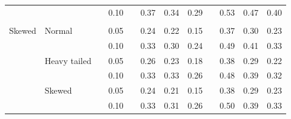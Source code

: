 \documentclass[12pt]{article} %
\begin{document}
\begin{table}[ht]
\begin{scriptsize}
\begin{center}
\begin{tabular}{ll p{.1cm} c p{.1cm} rrr p{.1cm} rrr}
             &              && 0.10 &&  0.37 & 0.34 & 0.29 && 0.53 & 0.47 & 0.40 \\ 
             &&&&&&&&&&&\\
Skewed       & Normal       && 0.05 &&  0.24 & 0.22 & 0.15 && 0.37 & 0.30 & 0.23 \\ 
             &              && 0.10 &&  0.33 & 0.30 & 0.24 && 0.49 & 0.41 & 0.33 \\ 
             & Heavy tailed && 0.05 &&  0.26 & 0.23 & 0.18 && 0.38 & 0.29 & 0.22 \\ 
             &              && 0.10 &&  0.33 & 0.33 & 0.26 && 0.48 & 0.39 & 0.32 \\ 
             & Skewed       && 0.05 &&  0.24 & 0.21 & 0.15 && 0.38 & 0.29 & 0.23 \\ 
             &              && 0.10 &&  0.33 & 0.31 & 0.26 && 0.50 & 0.39 & 0.33 \\ 

\hline
\end{tabular}
\end{center}
\end{scriptsize}
\end{table}
\end{document}
